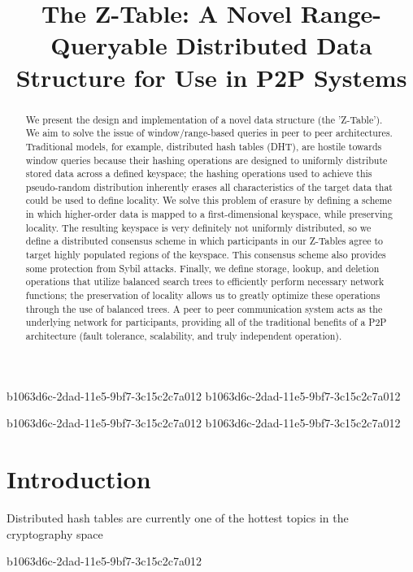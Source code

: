 \documentclass[12pt]{article}
\title{The Z-Table: A Novel Range-Queryable Distributed Data Structure for Use in P2P Systems}
\begin{document}
b1063d6c-2dad-11e5-9bf7-3c15c2c7a012
b1063d6c-2dad-11e5-9bf7-3c15c2c7a012\maketitle

\begin{abstract}
We present the design and implementation of a novel data structure (the 'Z-Table'). We aim to solve the issue of window/range-based queries in peer to peer architectures. Traditional models, for example,  distributed hash tables (DHT), are hostile towards window queries because their hashing operations are designed to uniformly distribute stored data across a defined keyspace; the hashing operations used to achieve this pseudo-random distribution inherently erases all characteristics of the target data that could be used to define locality. We solve this problem of erasure by defining a scheme in which higher-order data is mapped to a first-dimensional keyspace, while preserving locality. The resulting keyspace is very definitely not uniformly distributed, so we define a distributed consensus scheme in which participants in our Z-Tables agree to target highly populated regions of the keyspace. This consensus scheme also provides some protection from Sybil attacks. Finally, we define storage, lookup, and deletion operations that utilize balanced search trees to efficiently perform necessary network functions; the preservation of locality allows us to greatly optimize these operations through the use of balanced trees. A peer to peer communication system acts as the underlying network for participants, providing all of the traditional benefits of a P2P architecture (fault tolerance, scalability, and truly independent operation).
\end{abstract}

b1063d6c-2dad-11e5-9bf7-3c15c2c7a012
\newpage
b1063d6c-2dad-11e5-9bf7-3c15c2c7a012\section{Introduction}
Distributed hash tables are currently one of the hottest topics in the cryptography space~\cite{Stoica:2001dj,Rowstron:2001ea,Ratnasamy:2001wn}

b1063d6c-2dad-11e5-9bf7-3c15c2c7a012\printbibliography
\end{document}
